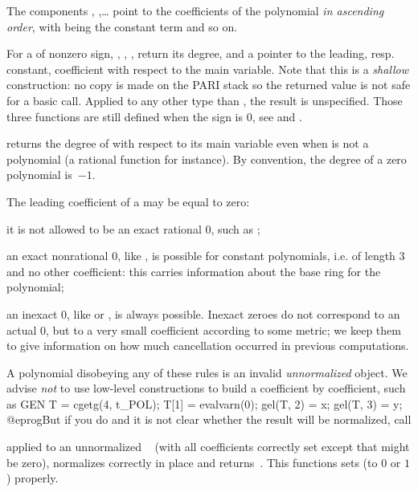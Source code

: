 The components , ,\dots {} point to the
coefficients of the polynomial \emph{in ascending order}, with 
being the constant term and so on.

For a  of nonzero sign, , ,
, return its degree, and a pointer to the leading,
resp. constant, coefficient with respect to the main variable. Note that this
is a \emph{shallow} construction: no copy is made on the PARI stack so the
returned value is not safe for a basic  call. Applied to any
other type than , the result is unspecified. Those three functions
are still defined when the sign is $0$, see  and
.

 returns the degree of  with respect to its
main variable even when  is not a polynomial (a rational function for
instance). By convention, the degree of a zero polynomial is~$-1$.

The leading coefficient of a  may be equal to zero:

\item it is not allowed to be an exact rational $0$, such as ;

\item an exact nonrational $0$, like , is possible for
constant polynomials, i.e. of length $3$ and no other coefficient: this
carries information about the base ring for the polynomial;

\item an inexact $0$, like  or , is always
possible. Inexact zeroes do not correspond to an actual $0$, but to a
very small coefficient according to some metric; we keep them to give
information on how much cancellation occurred in previous computations.

A polynomial disobeying any of these rules is an invalid \emph{unnormalized}
object. We advise \emph{not} to use low-level constructions to build a
 coefficient by coefficient, such as
\bprog
  GEN T = cgetg(4, t_POL);
  T[1] = evalvarn(0);
  gel(T, 2) = x;
  gel(T, 3) = y;
@eprog\noindent But if you do and it is not clear whether the result will be
normalized, call

 applied to an unnormalized ~
(with all coefficients correctly set except that  might
be zero), normalizes  correctly in place and returns~. This
functions sets  (to $0$ or $1$) properly.

